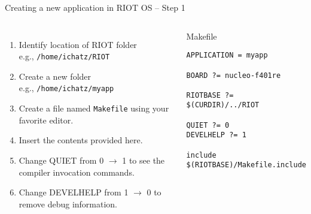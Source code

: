 \documentclass[aspectratio=169]{beamer}
\newcounter{saveenumi}
\newcommand{\seti}{\setcounter{saveenumi}{\value{enumi}}}
\begin{document}
\begin{frame}[fragile]{Creating a new application in RIOT OS -- Step 1} 
\begin{columns}

\begin{enumerate}

\item<1-> Identify location of RIOT folder\\e.g., \alert{\texttt{/home/ichatz/RIOT}}

\item<2-> Create a new folder\\e.g., \alert{\texttt{/home/ichatz/myapp}}

\item<3-> Create a file named \texttt{Makefile} using your favorite editor.

\item<4-> Insert the contents provided here.

\item<5-> Change QUIET from 0 $\rightarrow$ 1 to see the compiler invocation commands. 

\item<6-> Change DEVELHELP from 1 $\rightarrow$ 0 to remove debug information.

\seti

\end{enumerate}

\vspace{-.5cm}
\begin{exampleblock}{Makefile}
\begin{verbatim}
APPLICATION = myapp

BOARD ?= nucleo-f401re

RIOTBASE ?= $(CURDIR)/../RIOT

QUIET ?= 0
DEVELHELP ?= 1

include $(RIOTBASE)/Makefile.include
\end{verbatim}
\end{exampleblock}

\end{columns}
\vspace{5cm}
\end{frame}
\end{document}
